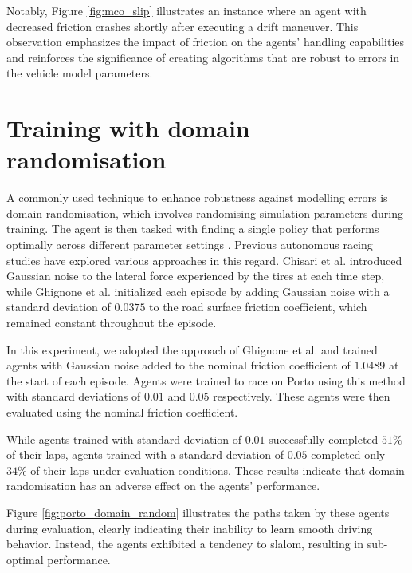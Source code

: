 Notably, Figure \ref{fig:mco_slip} illustrates an instance where an agent with decreased friction crashes shortly after executing a drift maneuver. 
This observation emphasizes the impact of friction on the agents' handling capabilities and reinforces the significance of creating algorithms that are robust to errors in the vehicle model parameters.




\section{Training with domain randomisation}

A commonly used technique to enhance robustness against modelling errors is domain randomisation, which involves randomising simulation parameters during training. 
The agent is then tasked with finding a single policy that performs optimally across different parameter settings \cite{Zhou2020}. 
Previous autonomous racing studies have explored various approaches in this regard. 
Chisari et al. \cite{Chisari2021} introduced Gaussian noise to the lateral force experienced by the tires at each time step, while Ghignone et al. \cite{Ghignone2022} initialized each episode by adding Gaussian noise with a standard deviation of $0.0375$ to the road surface friction coefficient, which remained constant throughout the episode.

In this experiment, we adopted the approach of Ghignone et al. \cite{Ghignone2022} and trained agents with Gaussian noise added to the nominal friction coefficient of $1.0489$ at the start of each episode. 
Agents were trained to race on Porto using this method with standard deviations of $0.01$ and $0.05$ respectively.
These agents were then evaluated using the nominal friction coefficient.

While agents trained with standard deviation of $0.01$ successfully completed $51\%$ of their laps, agents trained with a standard deviation of $0.05$ completed only $34\%$ of their laps under evaluation conditions.
These results indicate that domain randomisation has an adverse effect on the agents' performance.

Figure \ref{fig:porto_domain_random} illustrates the paths taken by these agents during evaluation, clearly indicating their inability to learn smooth driving behavior. 
Instead, the agents exhibited a tendency to slalom, resulting in sub-optimal performance.

